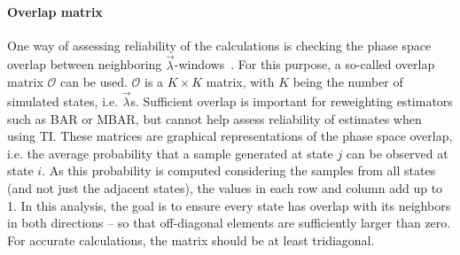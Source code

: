 \documentclass[9pt,bestpractices]{livecoms}
\begin{document}
\paragraph{Overlap matrix}
One way of assessing reliability of the calculations is checking the phase space overlap between neighboring $\vec{\lambda}$-windows~\cite{wu2005phasespaceb, wu2005phasespacec}. For this purpose, a so-called overlap matrix $\mathcal{O}$ can be used.  $\mathcal{O}$ is a $K\times K$ matrix, with $K$ being the number of simulated states, i.e. $\vec{\lambda}$s. Sufficient overlap is important for reweighting estimators such as BAR or MBAR, but cannot help assess reliability of estimates when using TI. 
These matrices are graphical representations of the phase space overlap, i.e. the average probability that a sample generated at state $j$ can be observed at state $i$. As this probability is computed considering the samples from all states (and not just the adjacent states), the values in each row and column add up to 1. In this analysis, the goal is to ensure every state has overlap with its neighbors in both directions -- so that off-diagonal elements are sufficiently larger than zero. For accurate calculations, the matrix should be at least tridiagonal.
\end{document}

